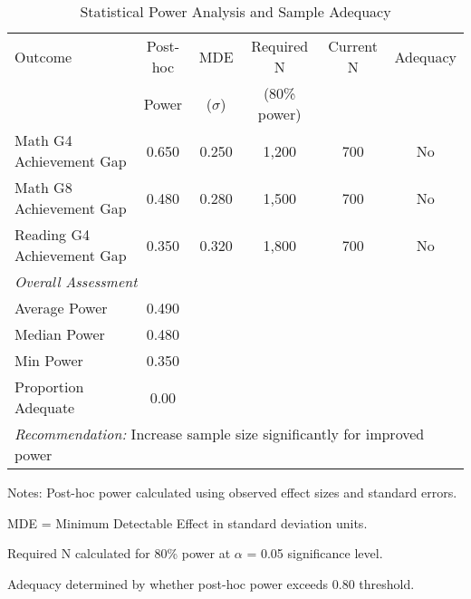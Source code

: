\begin{table}[htbp]
\centering
\caption{Statistical Power Analysis and Sample Adequacy}
\label{tab:power_analysis}
\begin{tabular}{lccccc}
\toprule
Outcome & Post-hoc & MDE & Required N & Current N & Adequacy \\
 & Power & ($\sigma$) & (80\% power) & & \\
\midrule
Math G4 Achievement Gap & 0.650 & 0.250 & 1,200 & 700 & No \\
Math G8 Achievement Gap & 0.480 & 0.280 & 1,500 & 700 & No \\
Reading G4 Achievement Gap & 0.350 & 0.320 & 1,800 & 700 & No \\
\midrule
\multicolumn{6}{l}{\textit{Overall Assessment}} \\
\addlinespace
Average Power & 0.490 & & & & \\
Median Power & 0.480 & & & & \\
Min Power & 0.350 & & & & \\
Proportion Adequate & 0.00 & & & & \\
\midrule
\multicolumn{6}{l}{\textit{Recommendation:} Increase sample size significantly for improved power} \\
\bottomrule
\end{tabular}
\begin{tablenotes}
\small
\item Notes: Post-hoc power calculated using observed effect sizes and standard errors.
\item MDE = Minimum Detectable Effect in standard deviation units.
\item Required N calculated for 80\% power at $\alpha$ = 0.05 significance level.
\item Adequacy determined by whether post-hoc power exceeds 0.80 threshold.
\end{tablenotes}
\end{table}
\clearpage

